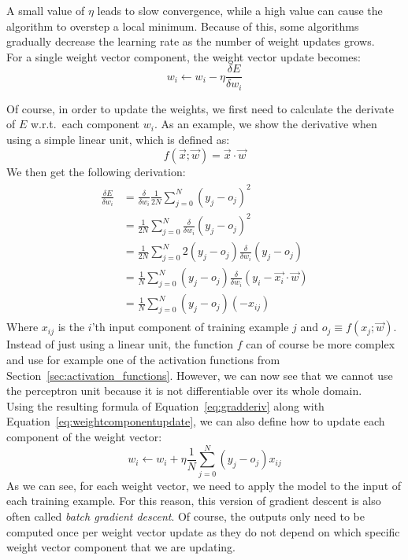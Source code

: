 A small value of $\eta$ leads to slow convergence, while a high value can cause the algorithm to overstep a local minimum. Because of this, some algorithms gradually decrease the learning rate as the number of weight updates grows.\\

For a single weight vector component, the weight vector update becomes:
\begin{equation}
    \label{eq:weightcomponentupdate}
    w_i \gets w_i - \eta \frac{\delta E}{\delta w_i}
\end{equation}

Of course, in order to update the weights, we first need to calculate the derivate of $E$ w.r.t.\ each component $w_i$. As an example, we show the derivative when using a simple linear unit, which is defined as:
\begin{equation}
    f(\overrightarrow{x};\overrightarrow{w}) = \overrightarrow{x} \cdot \overrightarrow{w}
\end{equation}
We then get the following derivation:
\begin{align}
    \label{eq:gradderiv}
    \begin{split}
        \frac{\delta E}{\delta w_i} &= \frac{\delta}{\delta w_i} \frac{1}{2N} \sum_{j=0}^N (y_j - o_j)^2\\
        &= \frac{1}{2N} \sum_{j=0}^N \frac{\delta}{\delta w_i} (y_j - o_j)^2\\
        &= \frac{1}{2N} \sum_{j=0}^N 2 (y_j - o_j) \frac{\delta}{\delta w_i} (y_j - o_j)\\
        &= \frac{1}{N} \sum_{j=0}^N (y_j - o_j) \frac{\delta}{\delta w_i} (y_i - \overrightarrow{x_i} \cdot \overrightarrow{w})\\
        &= \frac{1}{N} \sum_{j=0}^N (y_j - o_j)(-x_{ij})
    \end{split}
\end{align}
Where $x_{ij}$ is the $i$'th input component of training example $j$ and $o_j \equiv f(x_j; \overrightarrow{w})$.
Instead of just using a linear unit, the function $f$ can of course be more complex and use for example one of the activation functions from Section~\ref{sec:activation_functions}.
However, we can now see that we cannot use the perceptron unit because it is not differentiable over its whole domain.\\

Using the resulting formula of Equation~\ref{eq:gradderiv} along with Equation~\ref{eq:weightcomponentupdate}, we can also define how to update each component of the weight vector:
\begin{equation}
    w_i \gets w_i + \eta \frac{1}{N} \sum_{j=0}^N (y_j - o_j)x_{ij}
\end{equation}
As we can see, for each weight vector, we need to apply the model to the input of each training example.
For this reason, this version of gradient descent is also often called \textit{batch gradient descent}.
Of course, the outputs only need to be computed once per weight vector update as they do not depend on which specific weight vector component that we are updating.\\

